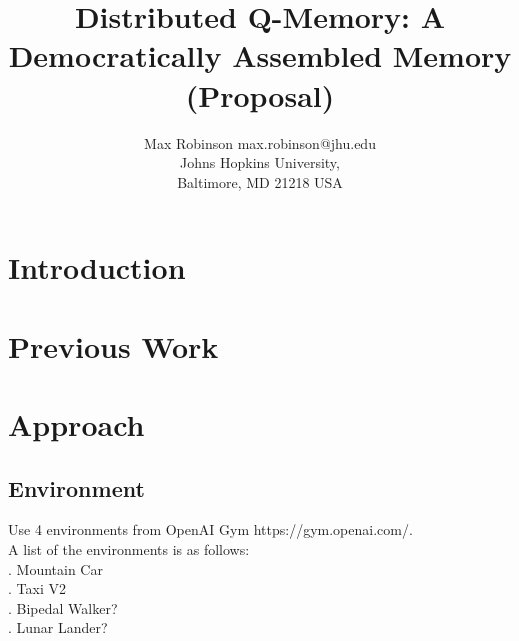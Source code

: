 \documentclass[jair,twoside,11pt,theapa]{article}
\begin{document}
\title{Distributed Q-Memory: A Democratically Assembled Memory (Proposal)}

\author{\name Max Robinson \email max.robinson@jhu.edu \\
       \addr Johns Hopkins University,\\
       Baltimore, MD 21218 USA
   }


\maketitle


\section{Introduction}
\label{Introduction}


\section{Previous Work}
\label{Literature Survey}

\section{Approach}
\label{Hypothesis}

\subsection{Environment}
Use 4 environments from OpenAI Gym https://gym.openai.com/. \\
A list of the environments is as follows: \\
. Mountain Car \\
. Taxi V2 \\
. Bipedal Walker? \\
. Lunar Lander? \\


\vskip 0.2in
%

\end{document}
